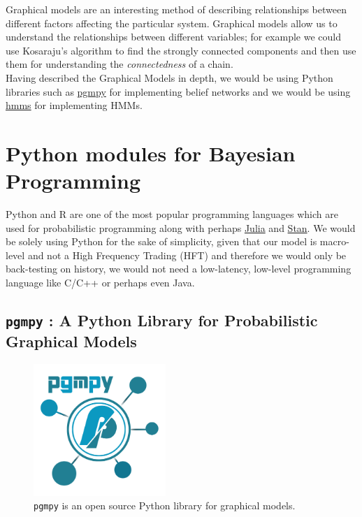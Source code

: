 Graphical models are an interesting method of describing relationships between different factors affecting the particular system. Graphical models allow us to understand the relationships between different variables; for example we could use Kosaraju's algorithm \cite{dmc} to find the strongly connected components and then use them for understanding the \textit{connectedness} of a chain.\\

Having described the Graphical Models in depth, we would be using Python libraries such as \hyperref[pgmpy]{pgmpy} for implementing belief networks and we would be using \hyperref[hmms]{hmms} for implementing HMMs.

\section{Python modules for Bayesian Programming}

Python and R are one of the most popular programming languages which are used for probabilistic programming along with perhaps \href{https://julialang.org/}{Julia} and \href{http://mc-stan.org/}{Stan}. We would be solely using Python for the sake of simplicity, given that our model is macro-level and not a High Frequency Trading (HFT) and therefore we would only be back-testing on history, we would not need a low-latency, low-level programming language like C/C++ or perhaps even Java. \\


\subsection{\texttt{pgmpy} : A Python Library for Probabilistic Graphical Models}
\label{pgmpy}

\begin{figure}
  \centering
  \includegraphics[width=50mm, scale=0.1]{img/logo.png}
  \caption{\texttt{pgmpy} is an open source Python library for graphical models.}
\end{figure}

